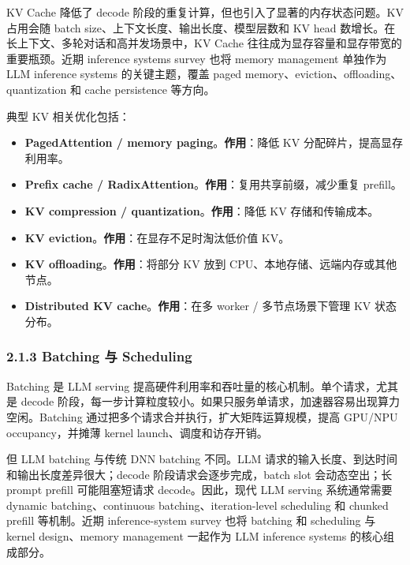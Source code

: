 \documentclass[a4paper,twocolumn,10pt]{ctexart}
\begin{document}
KV Cache 降低了 decode 阶段的重复计算，但也引入了显著的内存状态问题。KV 占用会随 batch size、上下文长度、输出长度、模型层数和 KV head 数增长。在长上下文、多轮对话和高并发场景中，KV Cache 往往成为显存容量和显存带宽的重要瓶颈。近期 inference systems survey 也将 memory management 单独作为 LLM inference systems 的关键主题，覆盖 paged memory、eviction、offloading、quantization 和 cache persistence 等方向。 


典型 KV 相关优化包括：



\begin{itemize}
\item \textbf{PagedAttention / memory paging}。\textbf{作用}：降低 KV 分配碎片，提高显存利用率。
\item \textbf{Prefix cache / RadixAttention}。\textbf{作用}：复用共享前缀，减少重复 prefill。
\item \textbf{KV compression / quantization}。\textbf{作用}：降低 KV 存储和传输成本。
\item \textbf{KV eviction}。\textbf{作用}：在显存不足时淘汰低价值 KV。
\item \textbf{KV offloading}。\textbf{作用}：将部分 KV 放到 CPU、本地存储、远端内存或其他节点。
\item \textbf{Distributed KV cache}。\textbf{作用}：在多 worker / 多节点场景下管理 KV 状态分布。
\end{itemize}





\subsubsection{2.1.3 Batching 与 Scheduling}

Batching 是 LLM serving 提高硬件利用率和吞吐量的核心机制。单个请求，尤其是 decode 阶段，每一步计算粒度较小。如果只服务单请求，加速器容易出现算力空闲。Batching 通过把多个请求合并执行，扩大矩阵运算规模，提高 GPU/NPU occupancy，并摊薄 kernel launch、调度和访存开销。


但 LLM batching 与传统 DNN batching 不同。LLM 请求的输入长度、到达时间和输出长度差异很大；decode 阶段请求会逐步完成，batch slot 会动态空出；长 prompt prefill 可能阻塞短请求 decode。因此，现代 LLM serving 系统通常需要 dynamic batching、continuous batching、iteration-level scheduling 和 chunked prefill 等机制。近期 inference-system survey 也将 batching 和 scheduling 与 kernel design、memory management 一起作为 LLM inference systems 的核心组成部分。 
\end{document}
